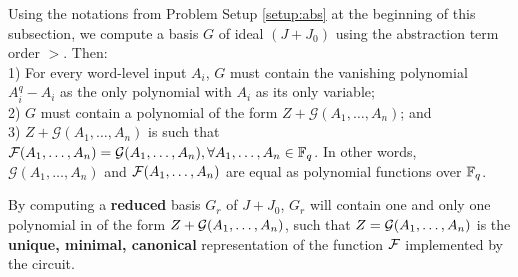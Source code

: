\begin{Theorem}
\cite{tim:phd}
Using the notations from Problem Setup \ref{setup:abs} at the beginning of this subsection,
we compute a \Grobner basis $G$ of ideal $(J+J_0)$ using the abstraction term 
order $>$. Then: \\
1) For every word-level input $A_i$, $G$ must contain the vanishing 
polynomial $A_i^q - A_i$ as the only polynomial with $A_i$ as its only 
variable;\\
2) $G$ must contain a polynomial of the form 
$Z + \mathcal{G}(A_1,\dots,A_n)$; and\\ 
3) $Z + \mathcal{G}(A_1,\dots,A_n)$ is such that 
${\mathcal{F}}(A_1,\dots,A_n) = {\mathcal{G}}(A_1,\dots,A_n),
\forall A_1,\dots,A_n \in {\mathbb{F}}_{q}$. 
In other words, ${\mathcal{G}}(A_1,\dots,A_n)$ and ${\mathcal{F}}(A_1,\dots,A_n)$ are
equal as polynomial functions over ${\mathbb{F}}_{q}$.
\label{thm:abs}
\end{Theorem}

\begin{Corollary}
By computing a {\bf reduced} \Grobner basis $G_r$ of $J + J_0$, 
$G_r$ will contain one and only one polynomial in of the form 
$Z + {\mathcal{G}}(A_1,\dots,A_n)$, such that $Z = {\mathcal{G}}(A_1,\dots,A_n)$ is the 
{\bf unique, minimal, canonical} representation of the function 
${\mathcal{F}}$ implemented by the circuit.  
\end{Corollary}

